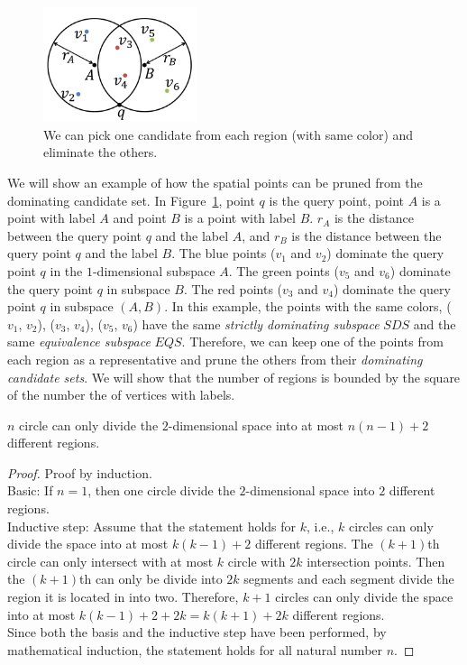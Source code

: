 \begin{figure}[h]
    \centering
      \includegraphics[width=0.4\textwidth]{figs/Circle_Spatial_Example}
    \caption{We can pick one candidate from each region (with same color) and eliminate the others.}
    \label{fig:circle_example}
\end{figure}

We will show an example of how the spatial points can be pruned from the dominating candidate set. In Figure~\ref{fig:circle_example}, point $q$ is the query point, point $A$ is a point with label $A$ and point $B$ is a point with label $B$. $r_{A}$ is the distance between the query point $q$ and the label $A$, and $r_{B}$ is the distance between the query point $q$ and the label $B$. The blue points ($v_1$ and $v_2$) dominate the query point $q$ in the $1$-dimensional subspace $A$. The green points ($v_5$ and $v_6$) dominate the query point $q$ in subspace $B$. The red points ($v_3$ and $v_4$) dominate the query point $q$ in subspace $(A, B)$. In this example, the points with the same colors, ($v_1$, $v_2$), ($v_3$, $v_4$), ($v_5$, $v_6$) have the same \emph{strictly dominating subspace} $\mathit{SDS}$ and the same \emph{equivalence subspace} $\mathit{EQS}$. Therefore, we can keep one of the points from each region as a representative and prune the others from their \emph{dominating candidate sets}. We will show that the number of regions is bounded by the square of the number the of vertices with labels.

\begin{property}
\label{ppt:circle_space}
$n$ circle can only divide the $2$-dimensional space into at most $n(n-1)+2$ different regions.
\end{property}

\begin{proof}
Proof by induction.\\
Basic: If $n=1$, then one circle divide the $2$-dimensional space into $2$ different regions.\\
Inductive step: Assume that the statement holds for $k$, i.e., $k$ circles can only divide the space into at most $k(k-1)+2$ different regions. The $(k+1)$th circle can only intersect with at most $k$ circle with $2k$ intersection points. Then the $(k+1)$th can only be divide into $2k$ segments and each segment divide the region it is located in into two. Therefore, $k+1$ circles can only divide the space into at most $k(k-1)+2+2k = k(k+1)+2k$ different regions.\\
Since both the basis and the inductive step have been performed, by mathematical induction, the statement holds for all natural number $n$.
\end{proof}

